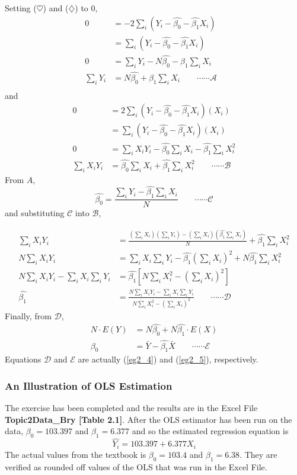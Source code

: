 \documentclass[11pt]{article}
\begin{document}
Setting ($\heartsuit$) and ($\diamondsuit$) to $0$,
\begin{align*}
0&= -2\sum_i (Y_i-\hat{\beta_0}-\hat{\beta_1}X_i)\\
&=\sum_i (Y_i-\hat{\beta_0}-\hat{\beta_1}X_i)\\
0&=\sum_i {Y_i} - N\hat{\beta_0} - \beta_1\sum_i X_i\\
\sum_iY_i &= N\hat{\beta_0} + \beta_1\sum_i X_i\quad\quad\cdots\cdots \mathcal{A}&\\
\end{align*}
and
\begin{align*}
0&= 2\sum_i (Y_i-\hat{\beta_0}-\hat{\beta_1}X_i)(X_i)\\
&=\sum_i (Y_i-\hat{\beta_0}-\hat{\beta_1}X_i)(X_i)\\
0&=\sum_i X_iY_i - \hat{\beta_0}\sum_i X_i - \hat{\beta_1}\sum_i X_i^2 \\
\sum_i X_iY_i &= \hat{\beta_0}\sum_i X_i + \hat{\beta_1}\sum_i X_i^2\quad\quad\cdots\cdots \mathcal{B}
\end{align*}
From $A$, 
$$\hat{\beta_0} = \frac{\sum_iY_i - \hat{\beta_1} \sum_iX_i}{N} \quad\quad\cdots\cdots \mathcal{C}$$ and substituting $\mathcal{C}$ into $\mathcal{B}$,

\begin{align*}
\sum_i X_iY_i &= \frac{(\sum_i X_i)(\sum_iY_i)- (\sum_i X_i)(\hat{\beta_1}\sum_iX_i)}{N} + \hat{\beta_1}\sum_i X_i^2\\
N\sum_i X_iY_i &= \sum_i X_i\sum_iY_i - \hat{\beta_1}(\sum_i X_i)^2 + N\hat{\beta_1}\sum_i X_i^2\\
N\sum_i X_iY_i - \sum_i X_i\sum_iY_i &= \hat{\beta_1}[N\sum_iX_i^2-(\sum_iX_i)^2]\\
\hat{\beta_1} &= \frac{N\sum_i X_iY_i - \sum_i X_i\sum_iY_i}{N\sum_i X_i^2 - (\sum_iX_i)^2}\quad\quad\cdots\cdots \mathcal{D}
\end{align*}
Finally, from $\mathcal{D}$,
\begin{align*}
N\cdot E(Y) &= N\hat{\beta_0} + N\hat{\beta_1}\cdot E(X)\\
\beta_0&= \bar{Y} - \hat{\beta_1}\bar{X} \quad\quad\cdots\cdots \mathcal{E}
\end{align*}
Equations $\mathcal{D}$ and $\mathcal{E}$ are actually (\ref{eg2_4}) and (\ref{eg2_5}), respectively.
\subsubsection{An Illustration of OLS Estimation}
The exercise has been completed and the results are in the Excel File \textbf{Topic2Data\_Bry [Table 2.1]}. After the OLS estimator has been run on the data, $\beta_0 = 103.397$ and $\beta_1 = 6.377$ and so the estimated regression equation is
\begin{equation}
\hat{Y_i} = 103.397 + 6.377X_i \label{eg2_6}
\end{equation}
The actual values from the textbook is $\beta_0 = 103.4$ and $\beta_1 = 6.38$. They are verified as rounded off values of the OLS that was run in the Excel File.
\end{document}
